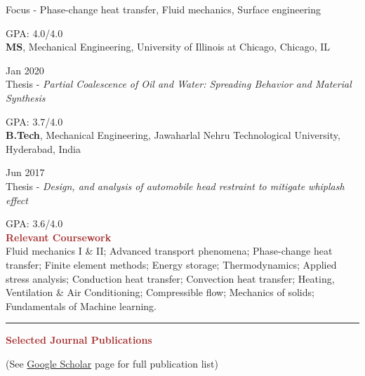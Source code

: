 \documentclass[11pt, letterpaper]{article}
\begin{document}
 Focus - Phase-change heat transfer, Fluid mechanics, Surface engineering \hfill \raggedright{GPA: 4.0/4.0}\\
\vspace{6pt}
\textbf{MS}, Mechanical Engineering, University of Illinois at Chicago, Chicago, IL \hfill \raggedright{Jan 2020}\\
Thesis - \textit{Partial Coalescence of Oil and Water: Spreading Behavior and Material Synthesis} \hfill \raggedright{GPA: 3.7/4.0}\\
\vspace{6pt}
\textbf{B.Tech}, Mechanical Engineering, Jawaharlal Nehru Technological University, Hyderabad, India \hfill \raggedright{Jun 2017}\\
Thesis - \textit{Design, and analysis of automobile head restraint to mitigate whiplash effect} \hfill \raggedright{GPA: 3.6/4.0}
\\[6pt]
\noindent \textbf{\large \textcolor{Brown}{Relevant Coursework}}\vspace{2pt} \\
Fluid mechanics I \& II; Advanced transport phenomena; Phase-change heat transfer; Finite element methods; Energy storage; Thermodynamics; Applied stress analysis; Conduction heat transfer; Convection heat transfer; Heating, Ventilation \& Air Conditioning; Compressible flow; Mechanics of solids; Fundamentals of Machine learning.
\vspace{-2pt} \\
\noindent \rule[2pt]{\textwidth}{0.5pt}
\newpage
\noindent \textbf{\large \textcolor{Brown}{Selected Journal Publications}}\hfill \raggedright{(See \href{https://scholar.google.com/citations?user=oQHSsp4AAAAJ&hl=en}{Google Scholar} page for full publication list)}\\
\end{document}
